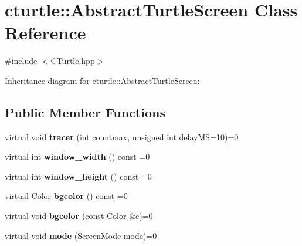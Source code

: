 \hypertarget{classcturtle_1_1AbstractTurtleScreen}{}\section{cturtle\+:\+:Abstract\+Turtle\+Screen Class Reference}
\label{classcturtle_1_1AbstractTurtleScreen}


{\ttfamily \#include $<$C\+Turtle.\+hpp$>$}



Inheritance diagram for cturtle\+:\+:Abstract\+Turtle\+Screen\+:
\subsection*{Public Member Functions}
\begin{DoxyCompactItemize}
\item 
\mbox{\label{classcturtle_1_1AbstractTurtleScreen_ad8e8c7abcc876b2ddd7d19494bb71985}} 
virtual void {\bfseries tracer} (int countmax, unsigned int delay\+MS=10)=0
\item 
\mbox{\label{classcturtle_1_1AbstractTurtleScreen_a1ddb52212ec961b27c9c40c0786a2dee}} 
virtual int {\bfseries window\+\_\+width} () const =0
\item 
\mbox{\label{classcturtle_1_1AbstractTurtleScreen_a8a03d248a0a7b02e88d891f24a27fb8d}} 
virtual int {\bfseries window\+\_\+height} () const =0
\item 
\mbox{\label{classcturtle_1_1AbstractTurtleScreen_ac542d5c180390842d99a6078965aa077}} 
virtual \hyperlink{classcturtle_1_1Color}{Color} {\bfseries bgcolor} () const =0
\item 
\mbox{\label{classcturtle_1_1AbstractTurtleScreen_ac421f2018c0f88e3bc3b36f716c3fc04}} 
virtual void {\bfseries bgcolor} (const \hyperlink{classcturtle_1_1Color}{Color} \&c)=0
\item 
\mbox{\label{classcturtle_1_1AbstractTurtleScreen_a66a3002d3a6713e615a58b345ec21062}} 
virtual void {\bfseries mode} (Screen\+Mode mode)=0

\end{DoxyCompactItemize}
